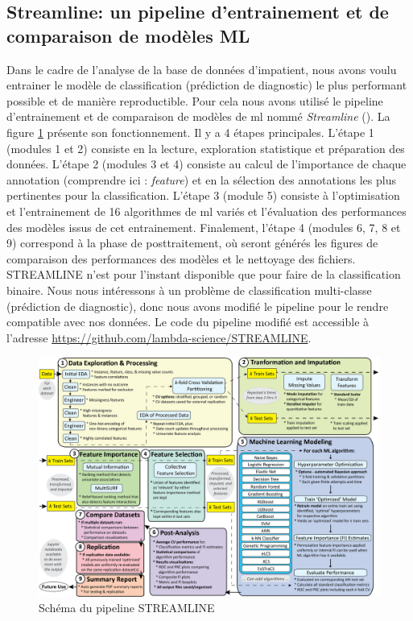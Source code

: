 \subsection{Streamline: un pipeline d'entrainement et de comparaison de modèles ML}
Dans le cadre de l'analyse de la base de données d'\gls{impatient}, nous avons voulu entrainer le modèle de classification (prédiction de diagnostic) le plus performant possible et de manière reproductible. Pour cela nous avons utilisé le pipeline d'entrainement et de comparaison de modèles de \gls{ml} nommé \textit{Streamline} (\cite{urbanowicz_streamline_2023}). La figure \ref{fig:streamline} présente son fonctionnement. Il y a 4 étapes principales. L'étape 1 (modules 1 et 2) consiste en la lecture, exploration statistique et préparation des données. L'étape 2 (modules 3 et 4) consiste au calcul de l'importance de chaque annotation (comprendre ici : \textit{feature}) et en la sélection des annotations les plus pertinentes pour la classification. L'étape 3 (module 5) consiste à l'optimisation et l'entrainement de 16 algorithmes de \gls{ml} variés et l'évaluation des performances des modèles issus de cet entrainement. Finalement, l'étape 4 (modules 6, 7, 8  et 9) correspond à la phase de posttraitement, où seront générés les figures de comparaison des performances des modèles et le nettoyage des fichiers. STREAMLINE n'est pour l'instant disponible que pour faire de la classification binaire. Nous nous intéressons à un problème de classification multi-classe (prédiction de diagnostic), donc nous avons modifié le pipeline pour le rendre compatible avec nos données. Le code du pipeline modifié est accessible à l'adresse \href{https://github.com/lambda-science/STREAMLINE}{https://github.com/lambda-science/STREAMLINE}.
\begin{figure}[!ht]
 \centering
 \includegraphics[width=1\textwidth]{figures/STREAMLINE_paper_lightcolor.png}
 \caption[Pipeline STREAMLINE]{Schéma du pipeline STREAMLINE}
 \label{fig:streamline}
\end{figure}
